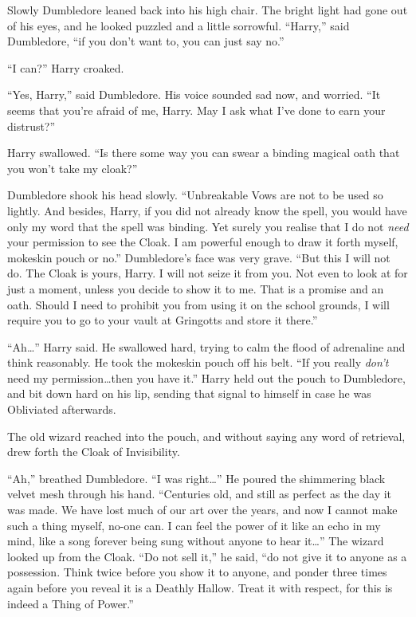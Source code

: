 Slowly Dumbledore leaned back into his high chair. The bright light had gone out of his eyes, and he looked puzzled and a little sorrowful. “Harry,” said Dumbledore, “if you don’t want to, you can just say no.”

“I can?” Harry croaked.

“Yes, Harry,” said Dumbledore. His voice sounded sad now, and worried. “It seems that you’re afraid of me, Harry. May I ask what I’ve done to earn your distrust?”

Harry swallowed. “Is there some way you can swear a binding magical oath that you won’t take my cloak?”

Dumbledore shook his head slowly. “Unbreakable Vows are not to be used so lightly. And besides, Harry, if you did not already know the spell, you would have only my word that the spell was binding. Yet surely you realise that I do not \emph{need} your permission to see the Cloak. I am powerful enough to draw it forth myself, mokeskin pouch or no.” Dumbledore’s face was very grave. “But this I will not do. The Cloak is yours, Harry. I will not seize it from you. Not even to look at for just a moment, unless you decide to show it to me. That is a promise and an oath. Should I need to prohibit you from using it on the school grounds, I will require you to go to your vault at Gringotts and store it there.”

“Ah…” Harry said. He swallowed hard, trying to calm the flood of adrenaline and think reasonably. He took the mokeskin pouch off his belt. “If you really \emph{don’t} need my permission…then you have it.” Harry held out the pouch to Dumbledore, and bit down hard on his lip, sending that signal to himself in case he was Obliviated afterwards.

The old wizard reached into the pouch, and without saying any word of retrieval, drew forth the Cloak of Invisibility.

“Ah,” breathed Dumbledore. “I was right…” He poured the shimmering black velvet mesh through his hand. “Centuries old, and still as perfect as the day it was made. We have lost much of our art over the years, and now I cannot make such a thing myself, no-one can. I can feel the power of it like an echo in my mind, like a song forever being sung without anyone to hear it…” The wizard looked up from the Cloak. “Do not sell it,” he said, “do not give it to anyone as a possession. Think twice before you show it to anyone, and ponder three times again before you reveal it is a Deathly Hallow. Treat it with respect, for this is indeed a Thing of Power.”

